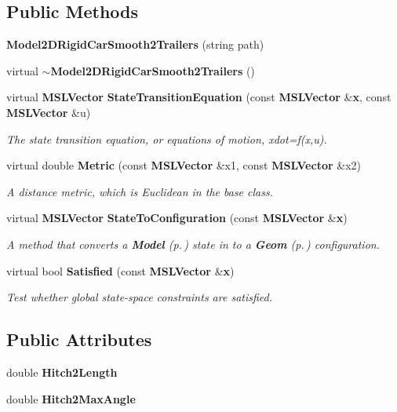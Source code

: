\subsection*{Public Methods}
\begin{CompactItemize}
\item 
{\bf Model2DRigid\-Car\-Smooth2Trailers} (string path)
\item 
virtual {\bf $\sim$Model2DRigid\-Car\-Smooth2Trailers} ()
\item 
virtual {\bf MSLVector} {\bf State\-Transition\-Equation} (const {\bf MSLVector} \&{\bf x}, const {\bf MSLVector} \&u)
\begin{CompactList}\small\item\em The state transition equation, or equations of motion, xdot=f(x,u).\item\end{CompactList}\item 
virtual double {\bf Metric} (const {\bf MSLVector} \&x1, const {\bf MSLVector} \&x2)
\begin{CompactList}\small\item\em A distance metric, which is Euclidean in the base class.\item\end{CompactList}\item 
virtual {\bf MSLVector} {\bf State\-To\-Configuration} (const {\bf MSLVector} \&{\bf x})
\begin{CompactList}\small\item\em A method that converts a {\bf Model} {\rm (p.\,\pageref{classModel})} state in to a {\bf Geom} {\rm (p.\,\pageref{classGeom})} configuration.\item\end{CompactList}\item 
virtual bool {\bf Satisfied} (const {\bf MSLVector} \&{\bf x})
\begin{CompactList}\small\item\em Test whether global state-space constraints are satisfied.\item\end{CompactList}\end{CompactItemize}
\subsection*{Public Attributes}
\begin{CompactItemize}
\item 
double {\bf Hitch2Length}
\item 
double {\bf Hitch2Max\-Angle}
\end{CompactItemize}


